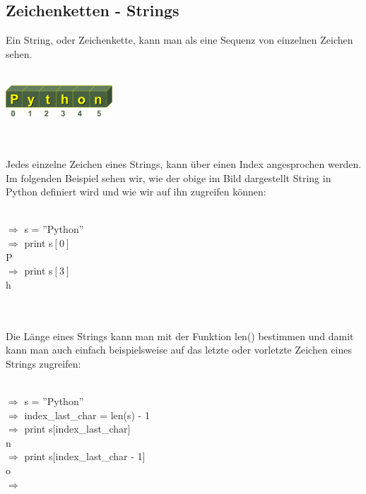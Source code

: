 \subsection{Zeichenketten - Strings}
Ein String, oder Zeichenkette, kann man als eine Sequenz von einzelnen Zeichen sehen.\\
\\
\begin{minipage}{-0.8\textwidth}
\centering
\includegraphics[width=4cm,height=1.2cm]{pics/string_indices.png}
\end{minipage}
\\ \\
Jedes einzelne Zeichen eines Strings, kann über einen Index angesprochen werden. Im folgenden Beispiel sehen wir, wie der obige im Bild dargestellt String in Python definiert wird und wie wir auf ihn zugreifen können: \\
\\
\begin{MyConsoleBox}{
${\Longrightarrow}$  s = ''Python'' \\
${\Longrightarrow}$  print s$[0]$ \\
P \\
${\Longrightarrow}$ print s$[3]$ \\
h \\
}\end{MyConsoleBox}\\
\\
Die Länge eines Strings kann man mit der Funktion len() bestimmen und damit kann man auch einfach beispielsweise auf das letzte oder vorletzte Zeichen eines Strings zugreifen: \\
\\
\begin{MyConsoleBox}{
${\Longrightarrow}$ s = ''Python'' \\
${\Longrightarrow}$ index\_last\_char = len(s) - 1 \\
${\Longrightarrow}$ print s$[$index\_last\_char$]$ \\
n \\
${\Longrightarrow}$ print s$[$index\_last\_char - 1$]$ \\
o \\
${\Longrightarrow}$ \\
}\end{MyConsoleBox} \\
